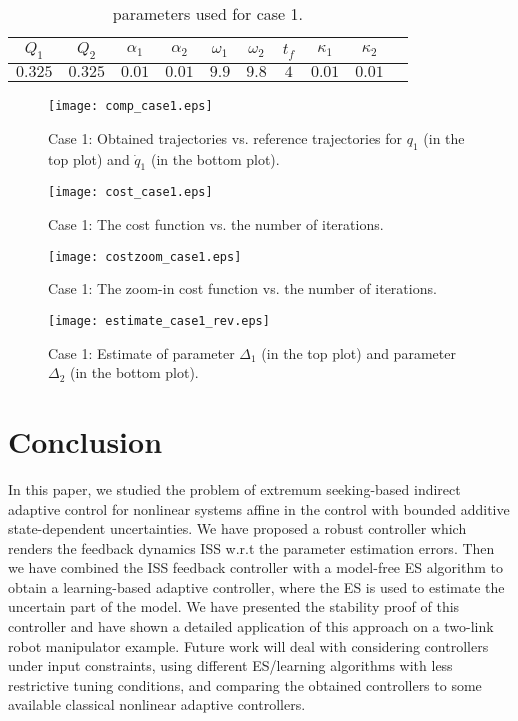 \documentclass[twoside,leqno,onecolumn]{article}
\begin{document}
\begin{table}
\caption{parameters used for case 1.} \label{tab:varying1}
\centering
\begin{tabular}{ |c|c|c|c|c|c|c|c|c|c| }
 \hline
$Q_1$ & $Q_2$ & $\alpha_1$ & $\alpha_2$& $\omega_1$ &$\omega_2$&
$t_f$ &$\kappa_1$ &$\kappa_2$ \\ [0.5em] \hline
$0.325$ & $0.325$ & $0.01$ & $0.01$ & $9.9$ & $9.8$ & $4$  & $0.01$ & $0.01$\\
 \hline
\end{tabular}
\end{table}







\begin{figure}[!t]
 \centering
 \texttt{[image: comp\_case1.eps]}
 \caption{Case 1: Obtained trajectories vs. reference trajectories for $q_1$ (in the top plot) and $\dot{q}_1$ (in the bottom plot).}
 \label{fig:comp_case1}
\end{figure}

\begin{figure}[!t]
 \centering
 \texttt{[image: cost\_case1.eps]}
 \caption{Case 1: The cost function vs. the number of iterations.}
 \label{fig:cost_case1}
\end{figure}

\begin{figure}[!t]
 \centering
 \texttt{[image: costzoom\_case1.eps]}
 \caption{Case 1: The zoom-in cost function vs. the number of iterations.}
 \label{fig:costzoom_case1}
\end{figure}

\begin{figure}[!t]
 \centering
 \texttt{[image: estimate\_case1\_rev.eps]}
 \caption{Case 1: Estimate of parameter $\Delta_1$ (in the top plot) and parameter $\Delta_2$ (in the bottom plot).}
 \label{fig:estimate_case1}
\end{figure}

\section{Conclusion}
\label{sec:con} In this paper, we studied the problem of extremum
seeking-based indirect adaptive control for nonlinear systems
affine in the control with bounded additive state-dependent
uncertainties. We have proposed a robust controller which renders
the feedback dynamics ISS w.r.t the parameter estimation errors.
Then we have combined the ISS feedback controller with a
model-free ES algorithm to obtain a learning-based adaptive
controller, where the ES is used to estimate the uncertain part of
the model. We have presented the stability proof of this
controller and have shown a detailed application of this approach
on a two-link robot manipulator example. Future work will deal
with considering controllers under input constraints, using
different ES/learning algorithms with less restrictive tuning
conditions, and comparing the obtained controllers to some
available classical nonlinear adaptive controllers.




\end{document}
